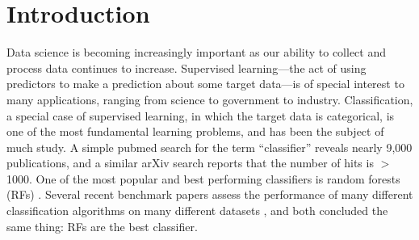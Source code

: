 \documentclass{article}
\begin{document}
 


\begin{abstract} 
\end{abstract} 

\section{Introduction}
\label{intro}

Data science is becoming increasingly important as our ability to collect and process data continues to increase. Supervised learning---the act of using predictors to make a prediction about some target data---is of special interest to many applications, ranging from science to government to industry. Classification, a special case of supervised learning, in which the target data is categorical, is one of the most fundamental learning problems, and has been the subject of much study. A simple pubmed search for the term ``classifier'' reveals nearly 9,000 publications, and a similar arXiv search reports that the number of hits is $>$1000. One of the most popular and best performing classifiers is random forests (RFs) \cite{Breiman2001}. Several recent benchmark papers assess the performance of many different classification algorithms on many different datasets \cite{Delgado2014,Caruana2008}, and both concluded the same thing: RFs are the best classifier.
\end{document}
